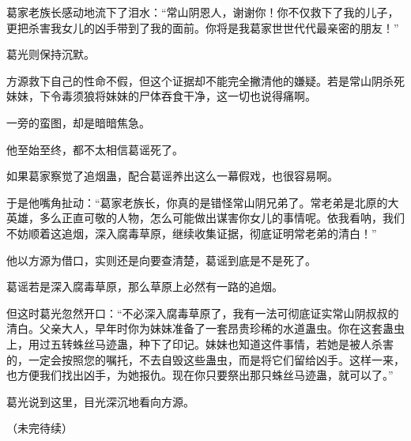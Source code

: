 \begin{this_body}
葛家老族长感动地流下了泪水：“常山阴恩人，谢谢你！你不仅救下了我的儿子，更把杀害我女儿的凶手带到了我的面前。你将是我葛家世世代代最亲密的朋友！”

葛光则保持沉默。

方源救下自己的性命不假，但这个证据却不能完全撇清他的嫌疑。若是常山阴杀死妹妹，下令毒须狼将妹妹的尸体吞食干净，这一切也说得痛啊。

一旁的蛮图，却是暗暗焦急。

他至始至终，都不太相信葛谣死了。

如果葛家察觉了追烟蛊，配合葛谣养出这么一幕假戏，也很容易啊。

于是他嘴角扯动：“葛家老族长，你真的是错怪常山阴兄弟了。常老弟是北原的大英雄，多么正直可敬的人物，怎么可能做出谋害你女儿的事情呢。依我看呐，我们不妨顺着这追烟，深入腐毒草原，继续收集证据，彻底证明常老弟的清白！”

他以方源为借口，实则还是向要查清楚，葛谣到底是不是死了。

葛谣若是深入腐毒草原，那么草原上必然有一路的追烟。

但这时葛光忽然开口：“不必深入腐毒草原了，我有一法可彻底证实常山阴叔叔的清白。父亲大人，早年时你为妹妹准备了一套昂贵珍稀的水道蛊虫。你在这套蛊虫上，用过五转蛛丝马迹蛊，种下了印记。妹妹也知道这件事情，若她是被人杀害的，一定会按照您的嘱托，不去自毁这些蛊虫，而是将它们留给凶手。这样一来，也方便我们找出凶手，为她报仇。现在你只要祭出那只蛛丝马迹蛊，就可以了。”

葛光说到这里，目光深沉地看向方源。

（未完待续）

\end{this_body}

